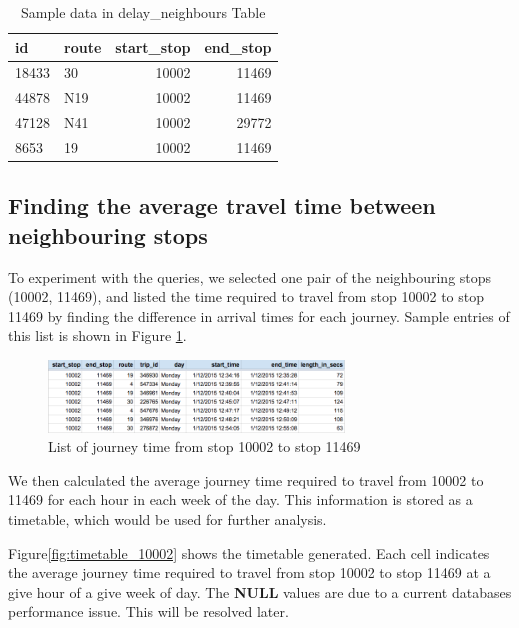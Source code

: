 \begin{table}
\centering
\begin{tabular}{@{}llrr@{}} \toprule
id & route & start\_stop & end\_stop \\ \midrule
18433 & 30 & 10002 & 11469 \\
44878 & N19 & 10002 & 11469 \\
47128 & N41 & 10002 & 29772 \\
8653 & 19 & 10002 & 11469 \\ \bottomrule
\end{tabular}
\caption{Sample data in delay\_neighbours Table}
\label{table:sample_neighbours_view}
\end{table}

\subsection{Finding the average travel time between neighbouring stops}
\par To experiment with the queries, we selected one pair of the neighbouring stops (10002, 11469), and listed the time required to travel from stop 10002 to stop 11469 by finding the difference in arrival times for each journey. Sample entries of this list is shown in Figure \ref{fig:journey_time_10002}.

\begin{figure}
\centering
\includegraphics[width=0.7\textwidth]{figures/journey_time_10002.png}
\caption{\label{fig:journey_time_10002} List of journey time from stop 10002 to stop 11469}
\end{figure}

\par We then calculated the average journey time required to travel from 10002 to 11469 for each hour in each week of the day. This information is stored as a timetable, which would be used for further analysis.

\par Figure\ref{fig:timetable_10002} shows the timetable generated. Each cell indicates the average journey time required to travel from stop 10002 to stop 11469 at a give hour of a give week of day. The \textbf{NULL} values are due to a current databases performance issue. This will be resolved later.

